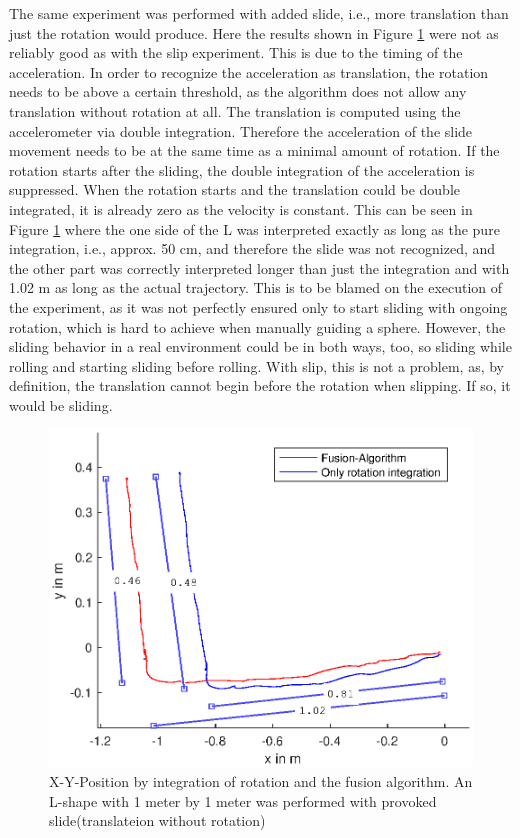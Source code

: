 \documentclass[letterpaper, 10 pt, conference]{ieeeconf}  %
\begin{document}
The same experiment was performed with added slide, i.e., more translation than just the rotation would produce.
Here the results shown in Figure \ref{LTestSlide} were not as reliably good as with the slip experiment.
This is due to the timing of the acceleration. In order to recognize the acceleration as translation, the rotation needs to be above a certain threshold, as the algorithm does not allow any translation without rotation at all.
The translation is computed using the accelerometer via double integration.
Therefore the acceleration of the slide movement needs to be at the same time as a minimal amount of rotation. 
If the rotation starts after the sliding, the double integration of the acceleration is suppressed.
When the rotation starts and the translation could be double integrated, it is already zero as the velocity is constant.
This can be seen in Figure \ref{LTestSlide} where the one side of the L was interpreted exactly as long as the pure integration, i.e., approx. 50 cm, and therefore the slide was not recognized, and the other part was correctly interpreted longer than just the integration and with 1.02 m as long as the actual trajectory.
This is to be blamed on the execution of the experiment, as it was not perfectly ensured only to start sliding with ongoing rotation, which is hard to achieve when manually guiding a sphere.
However, the sliding behavior in a real environment could be in both ways, too, so sliding while rolling and starting sliding before rolling.
With slip, this is not a problem, as, by definition, the translation cannot begin before the rotation when slipping.
If so, it would be sliding.
\begin{figure}
\includegraphics[width=\linewidth]{./graphics/LTestSlide.eps}
\caption{X-Y-Position by integration of rotation and the fusion algorithm. An L-shape with 1 meter by 1 meter was performed with provoked slide(translateion without rotation)}
\label{LTestSlide}
\end{figure}
\end{document}
